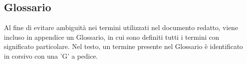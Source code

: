 \subsection{Glossario}
Al fine di evitare ambiguità nei termini utilizzati nel documento redatto, viene incluso in appendice un Glossario, in cui sono definiti tutti i termini con significato particolare. Nel testo, un termine presente nel Glossario è identificato in corsivo con una 'G' a pedice.